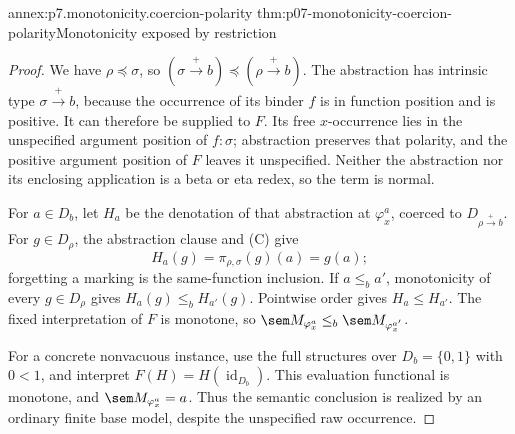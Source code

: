 \begin{annexitem}{annex:p7.monotonicity.coercion-polarity}
 {thm:p07-monotonicity-coercion-polarity}{Monotonicity exposed by restriction}
\begin{proof}
We have \(\rho\preceq\sigma\), so
\((\sigma\xrightarrow+b)\preceq(\rho\xrightarrow+b)\).
The abstraction has intrinsic type \(\sigma\xrightarrow+b\), because
the occurrence of its binder \(f\) is in function position and is positive.
It can therefore be supplied to \(F\).
Its free \(x\)-occurrence lies in the unspecified argument position of
\(f:\sigma\); abstraction preserves that polarity, and the positive
argument position of \(F\) leaves it unspecified.
Neither the abstraction nor its enclosing application is a beta or eta
redex, so the term is normal.

For \(a\in D_b\), let \(H_a\) be the denotation of that abstraction at
\(\varphi_x^a\), coerced to \(D_{\rho\xrightarrow+b}\).
For \(g\in D_\rho\), the abstraction clause and (C) give
\[
 H_a(g)=\pi_{\rho,\sigma}(g)(a)=g(a);
\]
forgetting a marking is the same-function inclusion.
If \(a\leq_b a'\), monotonicity of every \(g\in D_\rho\) gives
\(H_a(g)\leq_b H_{a'}(g)\). Pointwise order gives
\(H_a\leq H_{a'}\). The fixed interpretation of \(F\) is monotone, so
\(\sem M_{\varphi_x^a}\leq_b\sem M_{\varphi_x^{a'}}\).

For a concrete nonvacuous instance, use the full structures over
\(D_b=\{0,1\}\) with \(0<1\), and interpret
\(F(H)=H(\operatorname{id}_{D_b})\). This evaluation functional is
monotone, and \(\sem M_{\varphi_x^a}=a\).
Thus the semantic conclusion is realized by an ordinary finite base
model, despite the unspecified raw occurrence.
\end{proof}
\end{annexitem}

